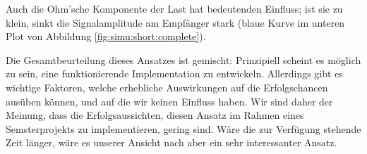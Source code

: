 Auch die  Ohm'sche Komponente der  Last hat  bedeutenden Einfluss; ist  sie zu
klein, sinkt die Signalamplitude am  Empf\"anger stark (blaue Kurve im unteren
Plot von Abbildung \ref{fig:simu:short:complete}).

Die  Gesamtbeurteilung  dieses   Ansatzes  ist  gemischt: Prinzipiell  scheint
es    m\"oglich   zu    sein,   eine    funktionierende   Implementation    zu
entwickeln. Allerdings   gibt   es   wichtige  Faktoren,   welche   erhebliche
Auswirkungen auf die Erfolgschancen aus\"uben k\"onnen, und auf die wir keinen
Einfluss haben. Wir sind daher der Meinung, dass die Erfolgsaussichten, diesen
Ansatz im Rahmen eines  Semsterprojekts zu implementieren, gering sind. W\"are
die zur  Verf\"ugung stehende  Zeit l\"anger, w\"are  es unserer  Ansicht nach
aber ein sehr interessanter Ansatz.
